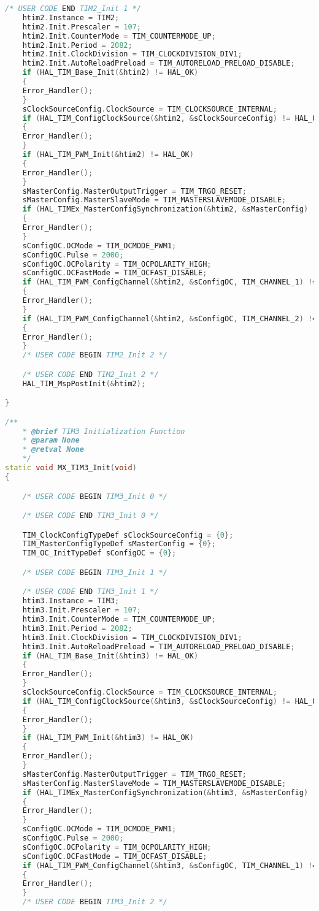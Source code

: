 \begin{lstlisting}[language=C++]
    /* USER CODE END TIM2_Init 1 */
    htim2.Instance = TIM2;
    htim2.Init.Prescaler = 107;
    htim2.Init.CounterMode = TIM_COUNTERMODE_UP;
    htim2.Init.Period = 2082;
    htim2.Init.ClockDivision = TIM_CLOCKDIVISION_DIV1;
    htim2.Init.AutoReloadPreload = TIM_AUTORELOAD_PRELOAD_DISABLE;
    if (HAL_TIM_Base_Init(&htim2) != HAL_OK)
    {
    Error_Handler();
    }
    sClockSourceConfig.ClockSource = TIM_CLOCKSOURCE_INTERNAL;
    if (HAL_TIM_ConfigClockSource(&htim2, &sClockSourceConfig) != HAL_OK)
    {
    Error_Handler();
    }
    if (HAL_TIM_PWM_Init(&htim2) != HAL_OK)
    {
    Error_Handler();
    }
    sMasterConfig.MasterOutputTrigger = TIM_TRGO_RESET;
    sMasterConfig.MasterSlaveMode = TIM_MASTERSLAVEMODE_DISABLE;
    if (HAL_TIMEx_MasterConfigSynchronization(&htim2, &sMasterConfig) != HAL_OK)
    {
    Error_Handler();
    }
    sConfigOC.OCMode = TIM_OCMODE_PWM1;
    sConfigOC.Pulse = 2000;
    sConfigOC.OCPolarity = TIM_OCPOLARITY_HIGH;
    sConfigOC.OCFastMode = TIM_OCFAST_DISABLE;
    if (HAL_TIM_PWM_ConfigChannel(&htim2, &sConfigOC, TIM_CHANNEL_1) != HAL_OK)
    {
    Error_Handler();
    }
    if (HAL_TIM_PWM_ConfigChannel(&htim2, &sConfigOC, TIM_CHANNEL_2) != HAL_OK)
    {
    Error_Handler();
    }
    /* USER CODE BEGIN TIM2_Init 2 */

    /* USER CODE END TIM2_Init 2 */
    HAL_TIM_MspPostInit(&htim2);

}

/**
    * @brief TIM3 Initialization Function
    * @param None
    * @retval None
    */
static void MX_TIM3_Init(void)
{

    /* USER CODE BEGIN TIM3_Init 0 */

    /* USER CODE END TIM3_Init 0 */

    TIM_ClockConfigTypeDef sClockSourceConfig = {0};
    TIM_MasterConfigTypeDef sMasterConfig = {0};
    TIM_OC_InitTypeDef sConfigOC = {0};

    /* USER CODE BEGIN TIM3_Init 1 */

    /* USER CODE END TIM3_Init 1 */
    htim3.Instance = TIM3;
    htim3.Init.Prescaler = 107;
    htim3.Init.CounterMode = TIM_COUNTERMODE_UP;
    htim3.Init.Period = 2082;
    htim3.Init.ClockDivision = TIM_CLOCKDIVISION_DIV1;
    htim3.Init.AutoReloadPreload = TIM_AUTORELOAD_PRELOAD_DISABLE;
    if (HAL_TIM_Base_Init(&htim3) != HAL_OK)
    {
    Error_Handler();
    }
    sClockSourceConfig.ClockSource = TIM_CLOCKSOURCE_INTERNAL;
    if (HAL_TIM_ConfigClockSource(&htim3, &sClockSourceConfig) != HAL_OK)
    {
    Error_Handler();
    }
    if (HAL_TIM_PWM_Init(&htim3) != HAL_OK)
    {
    Error_Handler();
    }
    sMasterConfig.MasterOutputTrigger = TIM_TRGO_RESET;
    sMasterConfig.MasterSlaveMode = TIM_MASTERSLAVEMODE_DISABLE;
    if (HAL_TIMEx_MasterConfigSynchronization(&htim3, &sMasterConfig) != HAL_OK)
    {
    Error_Handler();
    }
    sConfigOC.OCMode = TIM_OCMODE_PWM1;
    sConfigOC.Pulse = 2000;
    sConfigOC.OCPolarity = TIM_OCPOLARITY_HIGH;
    sConfigOC.OCFastMode = TIM_OCFAST_DISABLE;
    if (HAL_TIM_PWM_ConfigChannel(&htim3, &sConfigOC, TIM_CHANNEL_1) != HAL_OK)
    {
    Error_Handler();
    }
    /* USER CODE BEGIN TIM3_Init 2 */


\end{lstlisting}
